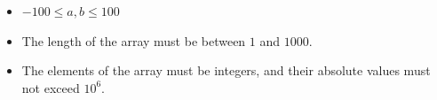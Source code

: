 \begin{itemize}
\item $-100 \leq a, b \leq 100$
\item The length of the array must be between $1$ and $1000$.
\item The elements of the array must be integers, and their absolute
values must not exceed $10^6$.
\end{itemize}
